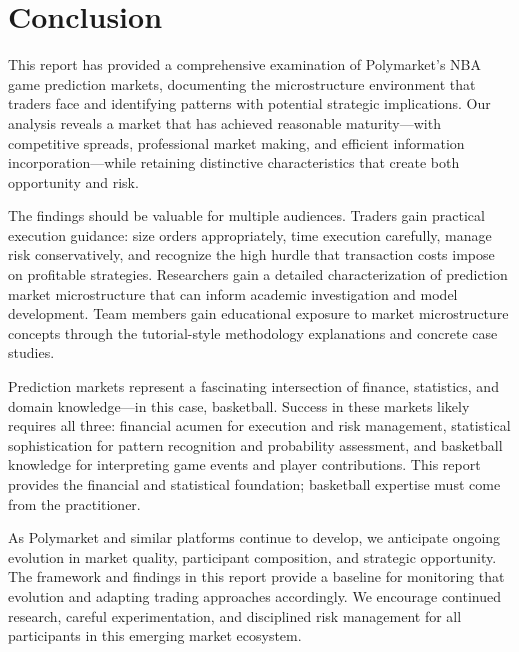 \section{Conclusion}

This report has provided a comprehensive examination of Polymarket's NBA game prediction markets, documenting the microstructure environment that traders face and identifying patterns with potential strategic implications. Our analysis reveals a market that has achieved reasonable maturity---with competitive spreads, professional market making, and efficient information incorporation---while retaining distinctive characteristics that create both opportunity and risk.

The findings should be valuable for multiple audiences. Traders gain practical execution guidance: size orders appropriately, time execution carefully, manage risk conservatively, and recognize the high hurdle that transaction costs impose on profitable strategies. Researchers gain a detailed characterization of prediction market microstructure that can inform academic investigation and model development. Team members gain educational exposure to market microstructure concepts through the tutorial-style methodology explanations and concrete case studies.

Prediction markets represent a fascinating intersection of finance, statistics, and domain knowledge---in this case, basketball. Success in these markets likely requires all three: financial acumen for execution and risk management, statistical sophistication for pattern recognition and probability assessment, and basketball knowledge for interpreting game events and player contributions. This report provides the financial and statistical foundation; basketball expertise must come from the practitioner.

As Polymarket and similar platforms continue to develop, we anticipate ongoing evolution in market quality, participant composition, and strategic opportunity. The framework and findings in this report provide a baseline for monitoring that evolution and adapting trading approaches accordingly. We encourage continued research, careful experimentation, and disciplined risk management for all participants in this emerging market ecosystem.
